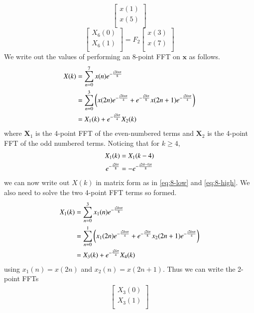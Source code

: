 \documentclass[journal,12pt,twocolumn]{IEEEtran}
\let\vec\mathbf
\renewcommand\thesection{\arabic{section}}
\begin{document}
\begin{enumerate}[label=\thesection.\arabic*]
\begin{equation}
\begin{bmatrix}
x(1) \\ 
x(5) \\ 
\end{bmatrix}
\end{equation}
\begin{equation}
\begin{bmatrix}
X_{6}(0) \\ 
X_{6}(1)\\ 
\end{bmatrix}
= F_{2}
\begin{bmatrix}
x(3) \\ 
x(7) \\ 
\end{bmatrix}
\end{equation}
\solution We write out the values of performing an 8-point FFT on $\vec{x}$ as follows.
\begin{align}
	X(k) &= \sum_{n = 0}^{7}x(n)e^{-\frac{\text{\j}2kn\pi}{8}} \\
		 &= \sum_{n = 0}^{3}\brak{x(2n)e^{-\frac{\text{\j}2kn\pi}{4}} + e^{-\frac{\text{\j}2k\pi}{8}}x(2n + 1)e^{-\frac{\text{\j}2kn\pi}{4}}} \\
		 &= X_1(k) + e^{-\frac{\text{\j}2k\pi}{4}}X_2(k) 
\end{align}
where $\vec{X}_1$ is the 4-point FFT of the even-numbered terms and $\vec{X}_2$ is the 4-point FFT of the odd numbered terms. Noticing that for $k \geq 4$,
\begin{align}
	X_1(k) &= X_1(k - 4) \\
	e^{-\frac{\text{\j}2k\pi}{8}} &= -e^{-\frac{\text{\j}2(k - 4)\pi}{8}}
\end{align}
we can now write out $X(k)$ in matrix form as in \eqref{eq:8-low} and \eqref{eq:8-high}. We also need to solve the two 4-point FFT terms so formed.
\begin{align}
	X_1(k) &= \sum_{n = 0}^{3}x_1(n)e^{-\frac{\text{\j}2kn\pi}{8}} \\
		 &= \sum_{n = 0}^{1}\brak{x_1(2n)e^{-\frac{\text{\j}2kn\pi}{4}} + e^{-\frac{\text{\j}2k\pi}{8}}x_2(2n + 1)e^{-\frac{\text{\j}2kn\pi}{4}}} \\
		 &= X_3(k) + e^{-\frac{\text{\j}2k\pi}{4}}X_4(k) 
\end{align}
using $x_1(n) = x(2n)$ and $x_2(n) = x(2n + 1)$. Thus we can write the 2-point FFTs
\begin{align}
\begin{bmatrix}
X_{3}(0) \\ 
X_{3}(1)\\ 
\end{bmatrix}

\end{align}
\end{enumerate}
\end{document}
